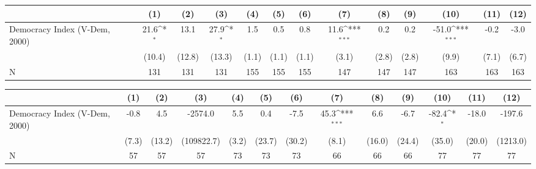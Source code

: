{
\def\sym#1{\ifmmode^{#1}\else\(^{#1}\)\fi}
\begin{tabular}{l*{12}{c}}
\hline\hline
                    &\multicolumn{1}{c}{(1)}         &\multicolumn{1}{c}{(2)}         &\multicolumn{1}{c}{(3)}         &\multicolumn{1}{c}{(4)}         &\multicolumn{1}{c}{(5)}         &\multicolumn{1}{c}{(6)}         &\multicolumn{1}{c}{(7)}         &\multicolumn{1}{c}{(8)}         &\multicolumn{1}{c}{(9)}         &\multicolumn{1}{c}{(10)}         &\multicolumn{1}{c}{(11)}         &\multicolumn{1}{c}{(12)}         \\
\hline
Democracy Index (V-Dem, 2000)&        21.6\sym{*}  &        13.1         &        27.9\sym{*}  &         1.5         &         0.5         &         0.8         &        11.6\sym{***}&         0.2         &         0.2         &       -51.0\sym{***}&        -0.2         &        -3.0         \\
                    &      (10.4)         &      (12.8)         &      (13.3)         &       (1.1)         &       (1.1)         &       (1.1)         &       (3.1)         &       (2.8)         &       (2.8)         &       (9.9)         &       (7.1)         &       (6.7)         \\
\hline
N                   &         131         &         131         &         131         &         155         &         155         &         155         &         147         &         147         &         147         &         163         &         163         &         163         \\
\hline\hline
\end{tabular}
}
{
\def\sym#1{\ifmmode^{#1}\else\(^{#1}\)\fi}
\begin{tabular}{l*{12}{c}}
\hline\hline
                    &\multicolumn{1}{c}{(1)}         &\multicolumn{1}{c}{(2)}         &\multicolumn{1}{c}{(3)}         &\multicolumn{1}{c}{(4)}         &\multicolumn{1}{c}{(5)}         &\multicolumn{1}{c}{(6)}         &\multicolumn{1}{c}{(7)}         &\multicolumn{1}{c}{(8)}         &\multicolumn{1}{c}{(9)}         &\multicolumn{1}{c}{(10)}         &\multicolumn{1}{c}{(11)}         &\multicolumn{1}{c}{(12)}         \\
\hline
Democracy Index (V-Dem, 2000)&        -0.8         &         4.5         &     -2574.0         &         5.5         &         0.4         &        -7.5         &        45.3\sym{***}&         6.6         &        -6.7         &       -82.4\sym{*}  &       -18.0         &      -197.6         \\
                    &       (7.3)         &      (13.2)         &  (109822.7)         &       (3.2)         &      (23.7)         &      (30.2)         &       (8.1)         &      (16.0)         &      (24.4)         &      (35.0)         &      (20.0)         &    (1213.0)         \\
\hline
N                   &          57         &          57         &          57         &          73         &          73         &          73         &          66         &          66         &          66         &          77         &          77         &          77         \\
\hline\hline
\end{tabular}
}
